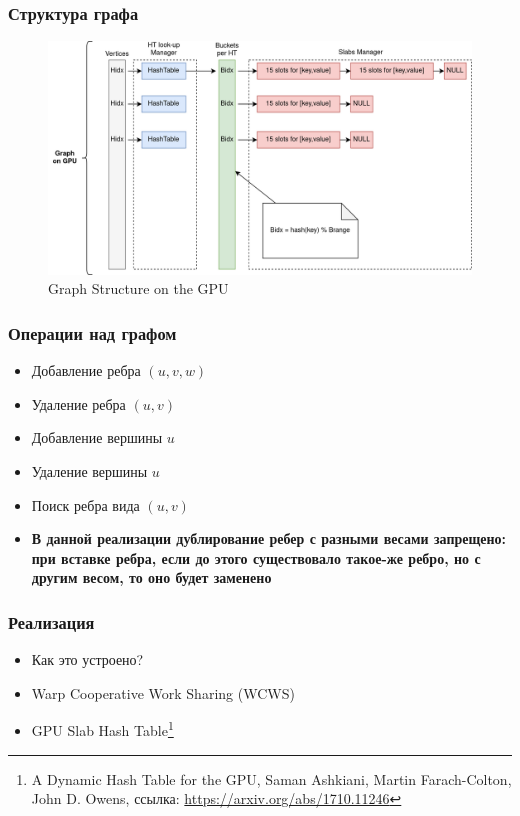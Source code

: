 \documentclass[xcolor=table,english]{beamer}
\begin{document}
\begin{frame}[fragile] \frametitle{Структура графа}
    \begin{minipage}[m]{0.95\linewidth}
        \begin{figure}
            \centering
            \includegraphics[width=\textwidth]{pictures/graph_gpu.png}
            \caption{Graph Structure on the GPU}
            \label{fig:graph_strucutre}
        \end{figure}
    \end{minipage}\hfill
\end{frame}

\begin{frame}[fragile] \frametitle{Операции над графом}
    \begin{itemize}
        \item Добавление ребра $(u,v,w)$
        \item Удаление ребра $(u,v)$
        \item Добавление вершины $u$
        \item Удаление вершины $u$
        \item Поиск ребра вида $(u,v)$
        \item \textbf{В данной реализации дублирование ребер с разными весами запрещено: при вставке ребра, если до этого существовало такое-же ребро, но с другим весом, то оно будет заменено}
    \end{itemize}
\end{frame}

\begin{frame}[fragile] \frametitle{Реализация}
    \begin{itemize}
        \item Как это устроено?
        \item Warp Cooperative Work Sharing (WCWS)
        \item GPU Slab Hash Table\footnote{A Dynamic Hash Table for the GPU, Saman Ashkiani, Martin Farach-Colton, John D. Owens, ссылка: \href{https://arxiv.org/abs/1710.11246}{https://arxiv.org/abs/1710.11246}}
    \end{itemize}
\end{frame}
\end{document}
